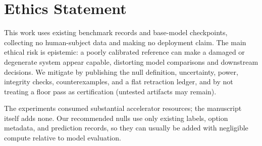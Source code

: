 \section{Ethics Statement}

This work uses existing benchmark records and base-model checkpoints, collecting no human-subject data and making no deployment claim. The main ethical risk is epistemic: a poorly calibrated reference can make a damaged or degenerate system appear capable, distorting model comparisons and downstream decisions. We mitigate by publishing the null definition, uncertainty, power, integrity checks, counterexamples, and a flat retraction ledger, and by not treating a floor pass as certification (untested artifacts may remain).

The experiments consumed substantial accelerator resources; the manuscript itself adds none. Our recommended nulls use only existing labels, option metadata, and prediction records, so they can usually be added with negligible compute relative to model evaluation.
